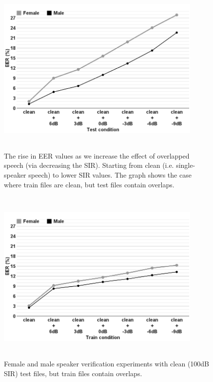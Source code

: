 \begin{figure}[h!]
	\centering
	\includegraphics[height = 3.43in, width=0.9\textwidth]{figures/sidingrid_ovlintest}
	\vspace{-1mm}
	\caption{ The rise in EER values as we increase the effect of overlapped speech (via decreasing the SIR). Starting from clean (i.e. single-speaker speech) to lower SIR values. The graph shows the case where train files are clean, but test files contain overlaps. }
	\label{fig:ch3_sidingrid_ovlintest_train_a}
\end{figure}
\begin{figure}[h!]%
	\centering
	\includegraphics[height = 3.43in, width=0.9\textwidth]{figures/sidingrid_ovlintrain}
	\vspace{-1mm}
	\caption{Female and male speaker verification experiments with clean (100dB SIR) test files, but train files contain overlaps.}
	\label{fig:ch3_sidingrid_ovlintest_train_b}
\end{figure}



